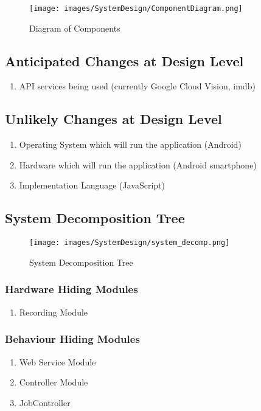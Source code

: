\documentclass{article}
\begin{document}
\begin{figure}[H]
    \centering
    \texttt{[image: images/SystemDesign/ComponentDiagram.png]}
    \caption{Diagram of Components}
    \label{fig:Component}
\end{figure}

\subsection{Anticipated Changes at Design Level}
\begin{enumerate}
    \item API services being used (currently Google Cloud Vision, imdb)
\end{enumerate}

\subsection{Unlikely Changes at Design Level}
\begin{enumerate}
    \item Operating System which will run the application (Android)
    \item Hardware which will run the application (Android smartphone)
    \item Implementation Language (JavaScript)
\end{enumerate}

\subsection{System Decomposition Tree}

\begin{figure}[H]
    \centering
    \texttt{[image: images/SystemDesign/system\_decomp.png]}
    \caption{System Decomposition Tree}
    \label{fig:Decomposition}
\end{figure}

\subsubsection{Hardware Hiding Modules}
\begin{enumerate}
    \item Recording Module
\end{enumerate}

\subsubsection{Behaviour Hiding Modules}
\begin{enumerate}
    \item Web Service Module
    \item Controller Module
    \item JobController
\end{enumerate}
\end{document}
